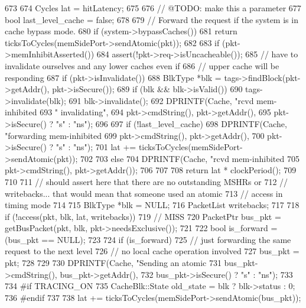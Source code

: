 \begin{DoxyCode}
673 {
674     Cycles lat = hitLatency;
675 
676     // @TODO: make this a parameter
677     bool last_level_cache = false;
678 
679     // Forward the request if the system is in cache bypass mode.
680     if (system->bypassCaches())
681         return ticksToCycles(memSidePort->sendAtomic(pkt));
682 
683     if (pkt->memInhibitAsserted()) {
684         assert(!pkt->req->isUncacheable());
685         // have to invalidate ourselves and any lower caches even if
686         // upper cache will be responding
687         if (pkt->isInvalidate()) {
688             BlkType *blk = tags->findBlock(pkt->getAddr(), pkt->isSecure());
689             if (blk && blk->isValid()) {
690                 tags->invalidate(blk);
691                 blk->invalidate();
692                 DPRINTF(Cache, "rcvd mem-inhibited %
693                         " invalidating\n",
694                         pkt->cmdString(), pkt->getAddr(),
695                         pkt->isSecure() ? "s" : "ns");
696             }
697             if (!last_level_cache) {
698                 DPRINTF(Cache, "forwarding mem-inhibited %
699                         pkt->cmdString(), pkt->getAddr(),
700                         pkt->isSecure() ? "s" : "ns");
701                 lat += ticksToCycles(memSidePort->sendAtomic(pkt));
702             }
703         } else {
704             DPRINTF(Cache, "rcvd mem-inhibited %
705                     pkt->cmdString(), pkt->getAddr());
706         }
707 
708         return lat * clockPeriod();
709     }
710 
711     // should assert here that there are no outstanding MSHRs or
712     // writebacks... that would mean that someone used an atomic
713     // access in timing mode
714 
715     BlkType *blk = NULL;
716     PacketList writebacks;
717 
718     if (!access(pkt, blk, lat, writebacks)) {
719         // MISS
720         PacketPtr bus_pkt = getBusPacket(pkt, blk, pkt->needsExclusive());
721 
722         bool is_forward = (bus_pkt == NULL);
723 
724         if (is_forward) {
725             // just forwarding the same request to the next level
726             // no local cache operation involved
727             bus_pkt = pkt;
728         }
729 
730         DPRINTF(Cache, "Sending an atomic %
731                 bus_pkt->cmdString(), bus_pkt->getAddr(),
732                 bus_pkt->isSecure() ? "s" : "ns");
733 
734 #if TRACING_ON
735         CacheBlk::State old_state = blk ? blk->status : 0;
736 #endif
737 
738         lat += ticksToCycles(memSidePort->sendAtomic(bus_pkt));
}}
\end{DoxyCode}
